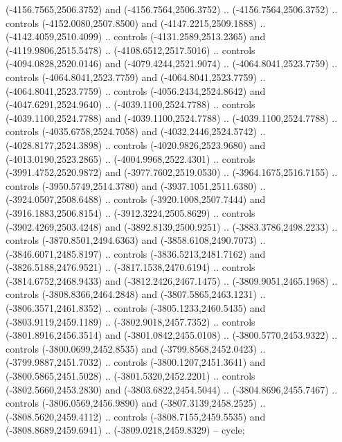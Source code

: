 \begin{scope}[shift={(430.80877,-416.69739)}]
\begin{scope}[shift={(4537.8125,-1856.4436)}]
\begin{scope}[shift={(-148.39113,-28.14259)}]
\begin{scope}[cm={{0.82632,0.0,0.0,0.82632,(-698.69811,430.29188)}}]
          (-4156.7565,2506.3752) and (-4156.7564,2506.3752) .. (-4156.7564,2506.3752) ..
          controls (-4152.0080,2507.8500) and (-4147.2215,2509.1888) ..
          (-4142.4059,2510.4099) .. controls (-4131.2589,2513.2365) and
          (-4119.9806,2515.5478) .. (-4108.6512,2517.5016) .. controls
          (-4094.0828,2520.0146) and (-4079.4244,2521.9074) .. (-4064.8041,2523.7759) ..
          controls (-4064.8041,2523.7759) and (-4064.8041,2523.7759) ..
          (-4064.8041,2523.7759) .. controls (-4056.2434,2524.8642) and
          (-4047.6291,2524.9640) .. (-4039.1100,2524.7788) .. controls
          (-4039.1100,2524.7788) and (-4039.1100,2524.7788) .. (-4039.1100,2524.7788) ..
          controls (-4035.6758,2524.7058) and (-4032.2446,2524.5742) ..
          (-4028.8177,2524.3898) .. controls (-4020.9826,2523.9680) and
          (-4013.0190,2523.2865) .. (-4004.9968,2522.4301) .. controls
          (-3991.4752,2520.9872) and (-3977.7602,2519.0530) .. (-3964.1675,2516.7155) ..
          controls (-3950.5749,2514.3780) and (-3937.1051,2511.6380) ..
          (-3924.0507,2508.6488) .. controls (-3920.1008,2507.7444) and
          (-3916.1883,2506.8154) .. (-3912.3224,2505.8629) .. controls
          (-3902.4269,2503.4248) and (-3892.8139,2500.9251) .. (-3883.3786,2498.2233) ..
          controls (-3870.8501,2494.6363) and (-3858.6108,2490.7073) ..
          (-3846.6071,2485.8197) .. controls (-3836.5213,2481.7162) and
          (-3826.5188,2476.9521) .. (-3817.1538,2470.6194) .. controls
          (-3814.6752,2468.9433) and (-3812.2426,2467.1475) .. (-3809.9051,2465.1968) ..
          controls (-3808.8366,2464.2848) and (-3807.5865,2463.1231) ..
          (-3806.3571,2461.8352) .. controls (-3805.1233,2460.5435) and
          (-3803.9119,2459.1189) .. (-3802.9018,2457.7352) .. controls
          (-3801.8916,2456.3514) and (-3801.0842,2455.0108) .. (-3800.5770,2453.9322) ..
          controls (-3800.0699,2452.8535) and (-3799.8568,2452.0423) ..
          (-3799.9887,2451.7032) .. controls (-3800.1207,2451.3641) and
          (-3800.5865,2451.5028) .. (-3801.5320,2452.2201) .. controls
          (-3802.5660,2453.2830) and (-3803.6822,2454.5044) .. (-3804.8696,2455.7467) ..
          controls (-3806.0569,2456.9890) and (-3807.3139,2458.2525) ..
          (-3808.5620,2459.4112) .. controls (-3808.7155,2459.5535) and
          (-3808.8689,2459.6941) .. (-3809.0218,2459.8329) -- cycle;


\end{scope}
\end{scope}
\end{scope}
\end{scope}
